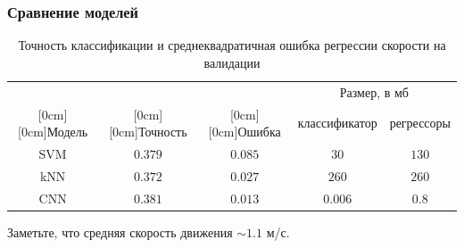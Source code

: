 \documentclass{beamer}
\begin{document}

\begin{frame}
\frametitle{Сравнение моделей} %

\begin{table}[H]
    \caption{Точность классификации и среднеквадратичная ошибка регрессии скорости на валидации}
    \begin{center}
        \begin{tabular}{|c|c|c|c|c|}
            \hline
            & & & \multicolumn{2}{c|}{Размер, в мб} \\
            \cline{4-5}
            \raisebox{1.5ex}[0cm][0cm]{Модель}
            & \raisebox{1.5ex}[0cm][0cm]{Точность}
            & \raisebox{1.5ex}[0cm][0cm]{Ошибка} 
            & классификатор
            & регрессоры
            \\
            \hline
            SVM
            & $0.379$ 
            & $0.085$ 
            & $30$
            & $130$
            \\
            \hline
            kNN
            & $0.372$
            & $0.027$
            & $260$
            & $260$
            \\
            \hline
            CNN
            & $0.381$
            & $0.013$
            & $0.006$
            & $0.8$
            \\
            \hline
            
        \end{tabular}
    \end{center}
\end{table}
Заметьте, что средняя скорость движения $\sim 1.1$ м/с.
\end{frame}
\end{document}
